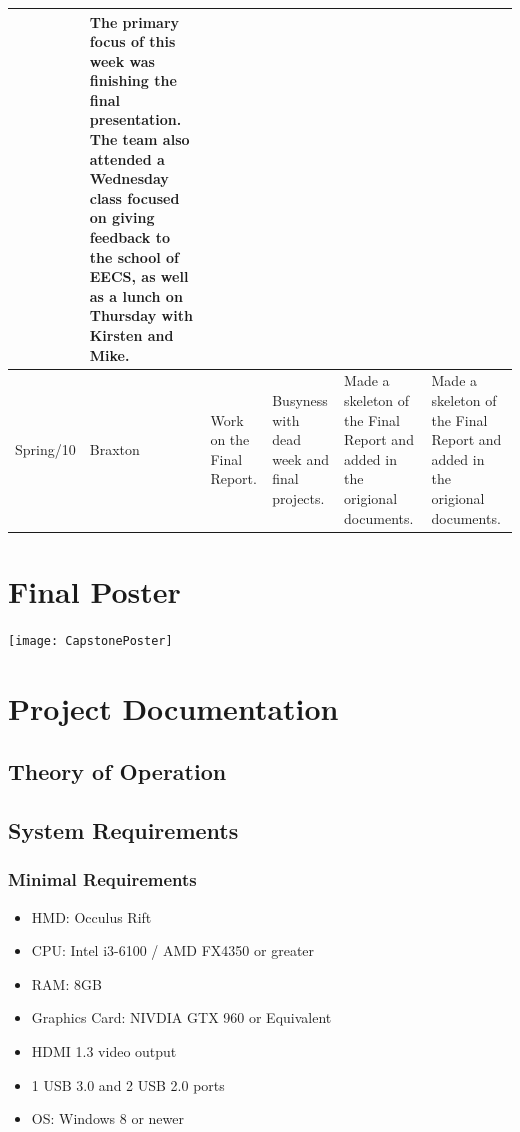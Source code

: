 \documentclass[onecolumn, draftclsnofoot,10pt, compsoc]{IEEEtran}
\begin{document}
\begin{tiny}
\begin{longtable}{ | p{} | p{} | p{} | p{} | p{} | p{} | }
&
The primary focus of this week was finishing the final presentation. The team also attended a Wednesday class focused on giving feedback to the school of EECS, as well as a lunch on Thursday with Kirsten and Mike. 
\\ \hline
Spring/10 & Braxton & 

Work on the Final Report.

&

Busyness with dead week and final projects.

&

Made a skeleton of the Final Report and added in the origional documents.

&

Made a skeleton of the Final Report and added in the origional documents.

\\ \hline
\hline 
\end{longtable}
\end{tiny}


\section{Final Poster}
\texttt{[image: CapstonePoster]}


\section{Project Documentation}

\subsection{Theory of Operation}



\subsection{System Requirements}
\subsubsection{Minimal Requirements}
\begin{itemize}
\item HMD: Occulus Rift
\item CPU: Intel i3-6100 / AMD FX4350 or greater
\item RAM: 8GB
\item Graphics Card: NIVDIA GTX 960 or Equivalent
\item HDMI 1.3 video output
\item 1 USB 3.0 and 2 USB 2.0 ports
\item OS: Windows 8 or newer
\end{itemize}
\end{document}
